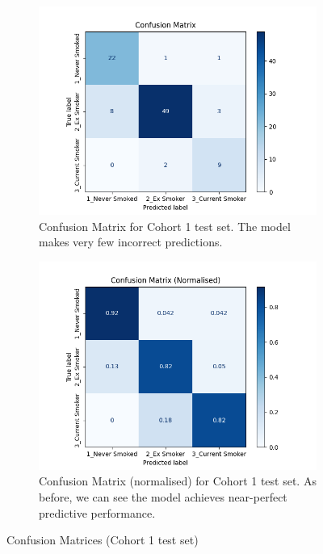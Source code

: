 \documentclass{article}
\begin{document}
\begin{figure}
    \centering
    \begin{subfigure}{0.75\textwidth}
        \centering
        \includegraphics[width=\linewidth]{cohort1_cm.png}
        \caption{Confusion Matrix for Cohort 1 test set. The model makes very few incorrect predictions.}
    \end{subfigure}
    \begin{subfigure}{0.75\textwidth}
        \centering
        \includegraphics[width=\linewidth]{cohort1_cm_n.png}
        \caption{Confusion Matrix (normalised) for Cohort 1 test set. As before, we can see the model achieves near-perfect predictive performance.}
    \end{subfigure}
    \caption{Confusion Matrices (Cohort 1 test set)}
    \label{fig:cohort1-cm}
\end{figure}
\end{document}

